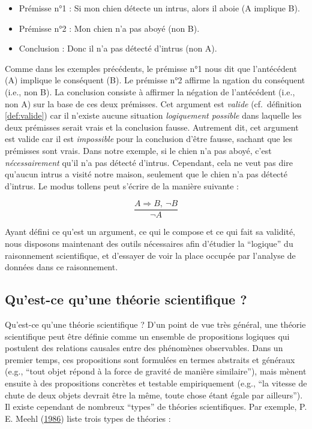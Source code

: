 \documentclass[
  a4paper,11pt,twoside,onecolumn,openright,final,oldfontcommands]{memoir}
\providecommand{\tightlist}{%
  \setlength{\itemsep}{0pt}\setlength{\parskip}{0pt}}
\theoremstyle{definition}
\theoremstyle{definition}
\theoremstyle{definition}
\theoremstyle{definition}
\theoremstyle{remark}
\begin{document}
\begin{itemize}
\tightlist
\item
  Prémisse n°1 : Si mon chien détecte un intrus, alors il aboie (A implique B).
\item
  Prémisse n°2 : Mon chien n'a pas aboyé (non B).
\item
  Conclusion : Donc il n'a pas détecté d'intrus (non A).
\end{itemize}

Comme dans les exemples précédents, le prémisse n°1 nous dit que l'antécédent (A) implique le conséquent (B). Le prémisse n°2 affirme la ngation du conséquent (i.e., non B). La conclusion consiste à affirmer la négation de l'antécédent (i.e., non A) sur la base de ces deux prémisses. Cet argument est \emph{valide} (cf.~définition \ref{def:valide}) car il n'existe aucune situation \emph{logiquement possible} dans laquelle les deux prémisses serait vrais et la conclusion fausse. Autrement dit, cet argument est valide car il est \emph{impossible} pour la conclusion d'être fausse, sachant que les prémisses sont vrais. Dans notre exemple, si le chien n'a pas aboyé, c'est \emph{nécessairement} qu'il n'a pas détecté d'intrus. Cependant, cela ne veut pas dire qu'aucun intrus a visité notre maison, seulement que le chien n'a pas détecté d'intrus. Le modus tollens peut s'écrire de la manière suivante :

\[\dfrac{A \Rightarrow B, \ \neg B}{\neg A}\]

Ayant défini ce qu'est un argument, ce qui le compose et ce qui fait sa validité, nous disposons maintenant des outils nécessaires afin d'étudier la ``logique'' du raisonnement scientifique, et d'essayer de voir la place occupée par l'analyse de données dans ce raisonnement.

\hypertarget{quest-ce-quune-thuxe9orie-scientifique}{%
\subsection{Qu'est-ce qu'une théorie scientifique ?}\label{quest-ce-quune-thuxe9orie-scientifique}}

Qu'est-ce qu'une théorie scientifique ? D'un point de vue très général, une théorie scientifique peut être définie comme un ensemble de propositions logiques qui postulent des relations causales entre des phénomènes observables. Dans un premier temps, ces propositions sont formulées en termes abstraits et généraux (e.g., ``tout objet répond à la force de gravité de manière similaire''), mais mènent ensuite à des propositions concrètes et testable empiriquement (e.g., ``la vitesse de chute de deux objets devrait être la même, toute chose étant égale par ailleurs''). Il existe cependant de nombreux ``types'' de théories scientifiques. Par exemple, P. E. Meehl (\protect\hyperlink{ref-meehl_what_1986}{1986}) liste trois types de théories :
\end{document}
